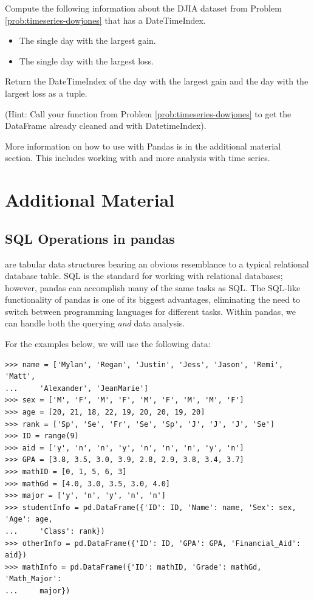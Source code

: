 \begin{problem}
Compute the following information about the DJIA dataset from Problem \ref{prob:timeseries-dowjones} that has a DateTimeIndex.
\begin{itemize}
    \item The single day with the largest gain.
    \item The single day with the largest loss.
\end{itemize}
Return the DateTimeIndex of the day with the largest gain and the day with the largest loss as a tuple.

(Hint: Call your function from Problem \ref{prob:timeseries-dowjones} to get the DataFrame already cleaned and with DatetimeIndex).
\end{problem}

More information on how to use  with Pandas is in the additional material section.
This includes working with  and more analysis with time series.

\newpage

\section*{Additional Material}
\subsection*{SQL Operations in pandas} %

 are tabular data structures bearing an obvious resemblance to a typical relational
database table.
SQL is the standard for working with relational databases; however, pandas can accomplish many of the same tasks as SQL.
The SQL-like functionality of pandas is
one of its biggest advantages, eliminating the need to switch between programming languages
for different tasks.
Within pandas, we can handle both the querying \emph{and} data analysis.

For the examples below, we will use the following data:
\begin{lstlisting}
>>> name = ['Mylan', 'Regan', 'Justin', 'Jess', 'Jason', 'Remi', 'Matt',
...		'Alexander', 'JeanMarie']
>>> sex = ['M', 'F', 'M', 'F', 'M', 'F', 'M', 'M', 'F']
>>> age = [20, 21, 18, 22, 19, 20, 20, 19, 20]
>>> rank = ['Sp', 'Se', 'Fr', 'Se', 'Sp', 'J', 'J', 'J', 'Se']
>>> ID = range(9)
>>> aid = ['y', 'n', 'n', 'y', 'n', 'n', 'n', 'y', 'n']
>>> GPA = [3.8, 3.5, 3.0, 3.9, 2.8, 2.9, 3.8, 3.4, 3.7]
>>> mathID = [0, 1, 5, 6, 3]
>>> mathGd = [4.0, 3.0, 3.5, 3.0, 4.0]
>>> major = ['y', 'n', 'y', 'n', 'n']
>>> studentInfo = pd.DataFrame({'ID': ID, 'Name': name, 'Sex': sex, 'Age': age,
...		'Class': rank})
>>> otherInfo = pd.DataFrame({'ID': ID, 'GPA': GPA, 'Financial_Aid': aid})
>>> mathInfo = pd.DataFrame({'ID': mathID, 'Grade': mathGd, 'Math_Major':
...		major})
\end{lstlisting}

